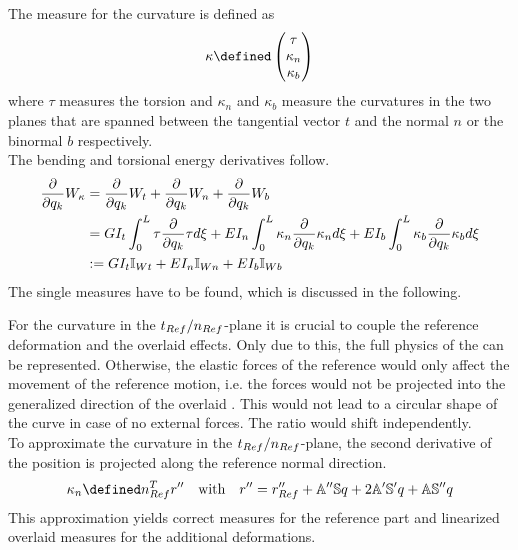 The measure for the curvature is defined as
%
\begin{align}
  \kappa \defined
  \begin{pmatrix}
\tau\\
\kappa_n\\
\kappa_b
\end{pmatrix}
\end{align}
%
where $\tau$ measures the torsion and $\kappa_n$ and $\kappa_b$ measure the curvatures in the two planes that are spanned between the tangential vector $t$ and the normal $n$ or the binormal $b$ respectively.\\
The bending and torsional energy derivatives follow.
%
\begin{align*}
  \frac{\partial {}}{\partial {q_k}} W _{\kappa} &= \frac{\partial {}}{\partial {q_k}} W _{t} + \frac{\partial {}}{\partial {q_k}} W _{n} + \frac{\partial {}}{\partial {q_k}} W _{b} \\
  &= G I _{t} \int _{0} ^{L} \tau \frac{\partial {}}{\partial {q_k}} \tau d \xi + E I _{n} \int _{0} ^{L} \kappa_n \frac{\partial {}}{\partial {q_k}} \kappa_n d \xi + E I _{b} \int _{0} ^{L} \kappa_b \frac{\partial {}}{\partial {q_k}} \kappa_b d \xi \\
  &:= G I _{t} \mathbb{I} _{Wt} + E I _{n} \mathbb{I} _{Wn} + E I _{b} \mathbb{I} _{Wb}
\end{align*}
%
The single measures have to be found, which is discussed in the following.\par
%
For the curvature in the $t _{Ref}/n _{Ref}$-plane it is crucial to couple the reference deformation and the overlaid effects.
Only due to this, the full physics of the \ring can be represented.
Otherwise, the elastic forces of the reference \DOFs would only affect the movement of the reference motion, i.e. the forces would not be projected into the generalized direction of the overlaid \DOFs.
This would not lead to a circular shape of the curve in case of no external forces.
The ratio would shift independently.\\
To approximate the curvature in the $t _{Ref}/n _{Ref}$-plane, the second derivative of the position is projected along the reference normal direction.
%
\begin{align*}
  \kappa_n \defined \nRef^T r'' \quad \text{with} \quad
  r '' = \rRef'' + \msA'' \msS q + 2 \msA' \msS' q + \msA \msS''q
\end{align*}
%
This approximation yields correct measures for the reference part and linearized overlaid measures for the additional deformations.

